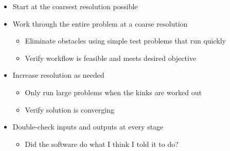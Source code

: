\documentclass[pdftex,cig,slideColor]{pp4slides}
\begin{document}
  \summary{}

  \begin{itemize}
  \item Start at the coarsest resolution possible
  \item Work through the entire problem at a coarse resolution
    \begin{itemize}
    \item Eliminate obstacles using simple test problems that
      run quickly
    \item Verify workflow is feasible and meets desired objective
    \end{itemize}
  \item Increase resolution as needed
    \begin{itemize}
    \item Only run large problems when the kinks are worked out
    \item Verify solution is converging
    \end{itemize}
  \item Double-check inputs and outputs at every stage
    \begin{itemize}
    \item Did the software do what I think I told it to do?
    \end{itemize}  
  \end{itemize}

  
\end{document}
